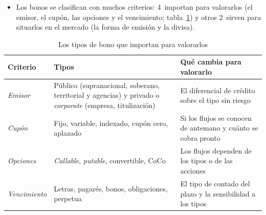 \documentclass[11pt]{article}
\begin{document}
\begin{itemize}
\item Los bonos se clasifican con muchos criterios: 4~importan para valorarlos (el emisor, el cupón, las opciones y el vencimiento; tabla~\ref{tab:tipos-bono}) y otros 2~sirven para situarlos en el mercado (la forma de emisión y la divisa).
\end{itemize}

\begin{table}[H]
\centering
\caption{Los tipos de bono que importan para valorarlos}\label{tab:tipos-bono}
\small
\begin{tabular}{>{\raggedright\arraybackslash}m{2.6cm}>{\raggedright\arraybackslash}m{6.2cm}>{\raggedright\arraybackslash}m{5.6cm}}
\toprule
\rowcolor{tceeazulpalido}\textbf{Criterio} & \textbf{Tipos} & \textbf{Qué cambia para valorarlo}\\
\midrule
\emph{Emisor} & Público (supranacional, soberano, territorial y agencias) y privado o \emph{corporate} (empresa, titulización) & El diferencial de crédito sobre el tipo sin riesgo\\
\addlinespace[0.2em]
\emph{Cupón} & Fijo, variable, indexado, cupón cero, aplazado & Si los flujos se conocen de antemano y cuánto se cobra pronto\\
\addlinespace[0.2em]
\emph{Opciones} & \emph{Callable}, \emph{putable}, convertible, CoCo & Los flujos dependen de los tipos o de las acciones\\
\addlinespace[0.2em]
\emph{Vencimiento} & Letras, pagarés, bonos, obligaciones, perpetua & El tipo de contado del plazo y la sensibilidad a los tipos\\
\bottomrule
\end{tabular}
\end{table}
\end{document}
